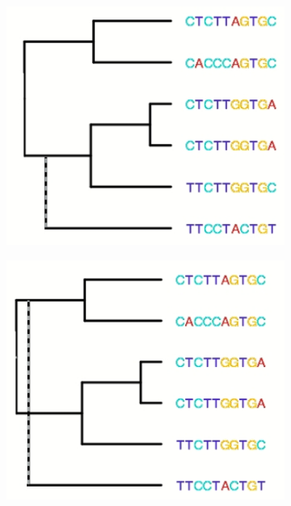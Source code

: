 \documentclass[]{article}
\begin{document}
\begin{figure}[H]
	\caption{Long branches attract each other}\label{fig:long:branches}
	\begin{subfigure}[b]{0.45\textwidth}
		\includegraphics[width=\textwidth]{LongBranchAttraction1}
	\end{subfigure}
	\begin{subfigure}[b]{0.45\textwidth}
		\includegraphics[width=\textwidth]{LongBranchAttraction2}
	\end{subfigure}
\end{figure}
\end{document}
